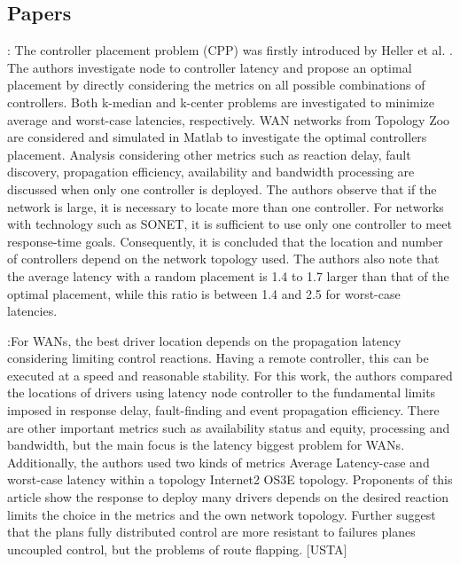 \documentclass[a4paper,10pt]{article}
\begin{document}
\subsection{Papers}
\cite{HeSh12}: The controller placement problem (CPP) was firstly introduced by Heller et al. \cite{HeSh12}. The authors investigate node to controller latency and propose an optimal placement by directly considering the metrics on all possible combinations of controllers. Both k-median and k-center problems are investigated to minimize average and worst-case latencies, respectively. WAN networks from Topology Zoo are considered and simulated in Matlab to investigate the optimal controllers placement. Analysis considering other metrics such as reaction delay, fault discovery, propagation efficiency, availability and bandwidth processing are discussed when only one controller is deployed. The authors observe that if the network is large, it is necessary to locate more than one controller. For networks with technology such as SONET, it is sufficient to use only one controller to meet response-time goals. Consequently, it is concluded that the location and number of controllers depend on the network topology used. The authors also note that the average latency with a random placement is 1.4 to 1.7 larger than that of the optimal placement, while this ratio is between 1.4 and 2.5 for worst-case latencies. 

\cite{HeSh12}:For WANs, the best driver location depends on the propagation latency considering limiting control reactions. Having a remote controller, this can be executed at a speed and reasonable stability.
For this work, the authors compared the locations of drivers using latency node controller to the fundamental limits imposed in response delay, fault-finding and event propagation efficiency. There are other important metrics such as availability status and equity, processing and bandwidth, but the main focus is the latency biggest problem for WANs. Additionally, the authors used two kinds of metrics Average Latency-case and worst-case latency within a topology Internet2 OS3E topology.
Proponents of this article show the response to deploy many drivers depends on the desired reaction limits the choice in the metrics and the own network topology. Further suggest that the plans fully distributed control are more resistant to failures planes uncoupled control, but the problems of route flapping.
[USTA]
\end{document}
